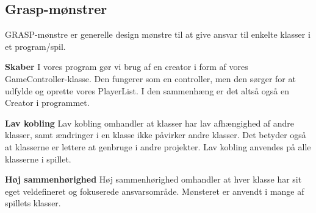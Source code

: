 \subsection{Grasp-mønstrer}
GRASP-mønstre er generelle design mønstre til at give ansvar til enkelte klasser i et program/spil.

\vspace{.3cm}
\textbf{Skaber}
I vores program gør vi brug af en creator i form af vores GameController-klasse. Den fungerer som en controller, men den sørger for at udfylde og oprette vores PlayerList. I den sammenhæng er det altså også en Creator i programmet.

\vspace{.3cm}
\textbf{Lav kobling}
Lav kobling omhandler at klasser har lav afhængighed af andre klasser, samt ændringer i en klasse ikke påvirker andre klasser. Det betyder også at klasserne er lettere at genbruge i andre projekter. Lav kobling anvendes på alle klasserne i spillet. 

\vspace{.3cm}
\textbf{Høj sammenhørighed}
Høj sammenhørighed omhandler at hver klasse har sit eget veldefineret og fokuserede ansvarsområde. Mønsteret er anvendt i mange af spillets klasser.




